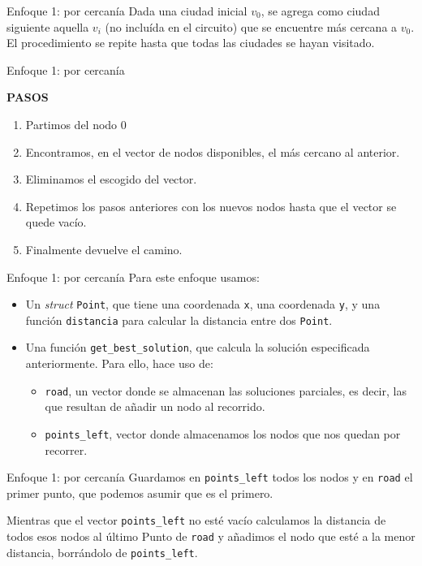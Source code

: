 \documentclass[10pt, xcolor=table]{beamer}
\begin{document}
\begin{frame}{Enfoque 1: por cercanía}
Dada una ciudad inicial \textit{$v_0$}, se agrega como ciudad siguiente aquella \textit{$v_i$} (no incluída en el circuito) que se encuentre más cercana a \textit{$v_0$}. El procedimiento se repite hasta que todas las ciudades se hayan visitado.
\end{frame}
\begin{frame}{Enfoque 1: por cercanía}
\begin{center}
\textbf{\large{PASOS}}
\end{center}
\begin{enumerate}
		\item Partimos del nodo $0$
		\item Encontramos, en el vector de nodos disponibles, el más cercano al anterior.
		\item Eliminamos el escogido del vector.
		\item Repetimos los pasos anteriores con los nuevos nodos hasta que el vector se quede vacío.
		\item Finalmente devuelve el camino.
	\end{enumerate}
\end{frame}
\begin{frame}{Enfoque 1: por cercanía}
Para este enfoque usamos:
\begin{itemize}
	\item Un \emph{struct} \texttt{Point}, que tiene una coordenada \texttt{x}, una coordenada \texttt{y}, y una función \texttt{distancia} para calcular la distancia entre dos \texttt{Point}.
	\item Una función \texttt{get\_best\_solution}, que calcula la solución especificada anteriormente. Para ello, hace uso de:
	\begin{itemize}
		\item \texttt{road}, un vector donde se almacenan las soluciones parciales, es decir, las que resultan de añadir un nodo al recorrido.
		\item \texttt{points\_left}, vector donde almacenamos los nodos que nos quedan por recorrer.
	\end{itemize}
\end{itemize}
\end{frame}

\begin{frame}{Enfoque 1: por cercanía}
Guardamos en \texttt{points\_left} todos los nodos y en \texttt{road} el primer punto, que podemos asumir que es el primero. 

Mientras que el vector \texttt{points\_left} no esté vacío calculamos la distancia de todos esos nodos al último Punto de \texttt{road} y añadimos el nodo que esté a la menor distancia, borrándolo de \texttt{points\_left}.
\end{frame}
\end{document}
